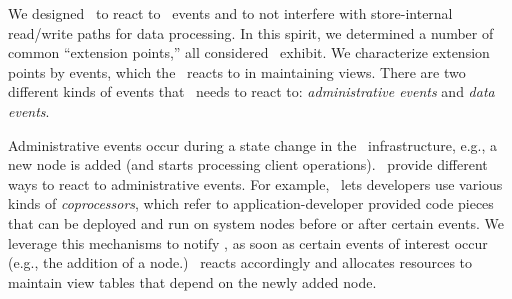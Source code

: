We designed \VMS\ to react to \KVS\ events and to not interfere with
store-internal read/write paths for data processing. In this spirit,
we determined a number of common ``extension points,'' all considered
\KVSs\ exhibit.  We characterize extension points by events, which the
\VMS\ reacts to in maintaining views.  There are two different kinds
of events that \VMS\ needs to react to: \textit{administrative events}
and \textit{data events}.

Administrative events occur during a state change in the
\KVS\ infrastructure, e.g., a new node is added (and starts processing
client operations).  \KVSs\ provide different ways to react to
administrative events. For example, \HB\ lets developers use various
kinds of \textit{coprocessors}, which refer to application-developer
provided code pieces that can be deployed and run on system nodes
before or after certain events. We leverage this mechanisms to notify
\VMS, as soon as certain events of interest occur (e.g., the addition
of a node.)  \VMS\ reacts accordingly and allocates resources to
maintain view tables that depend on the newly added node.



